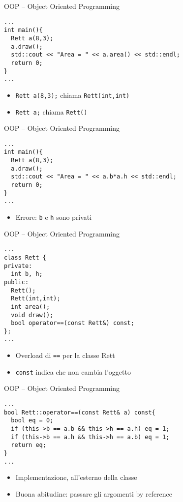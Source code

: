 \begin{frame}[fragile]{OOP -- Object Oriented Programming}
  \vfill
  \begin{lstlisting}[firstnumber=10]
...
int main(){
  Rett a(8,3);
  a.draw();
  std::cout << "Area = " << a.area() << std::endl;
  return 0;
}
...\end{lstlisting}
  \vfill
  \begin{itemize}
    \item \lstinline$Rett a(8,3);$ chiama \lstinline$Rett(int,int)$
    \item \lstinline$Rett a;$ chiama \lstinline$Rett()$
  \end{itemize}
  \vfill
\end{frame}

\begin{frame}[fragile]{OOP -- Object Oriented Programming}
  \vfill
  \begin{lstlisting}[firstnumber=10]
...
int main(){
  Rett a(8,3);
  a.draw();
  std::cout << "Area = " << a.b*a.h << std::endl;
  return 0;
}
...\end{lstlisting}
  \vfill
  \begin{itemize}
    \item Errore: \lstinline$b$ e \lstinline$h$ sono privati
  \end{itemize}
  \vfill
\end{frame}

\begin{frame}[fragile]{OOP -- Object Oriented Programming}
  \vfill
  \begin{lstlisting}[firstnumber=2]
...
class Rett {
private:
  int b, h;
public:
  Rett();
  Rett(int,int);
  int area();
  void draw();
  bool operator==(const Rett&) const;
};
...\end{lstlisting}
  \vfill
  \begin{itemize}
    \item Overload di \lstinline$==$ per la classe Rett
    \vfill
    \item \lstinline$const$ indica che non cambia l'oggetto
  \end{itemize}
  \vfill
\end{frame}

\begin{frame}[fragile]{OOP -- Object Oriented Programming}
  \vfill
  \begin{lstlisting}[firstnumber=37]
...
bool Rett::operator==(const Rett& a) const{
  bool eq = 0;
  if (this->b == a.b && this->h == a.h) eq = 1;
  if (this->b == a.h && this->h == a.b) eq = 1;
  return eq;
}
...\end{lstlisting}
  \vfill
  \begin{itemize}
    \item Implementazione, all'esterno della classe
    \vfill
    \item Buona abitudine: passare gli argomenti by reference
  \end{itemize}
  \vfill
\end{frame}

